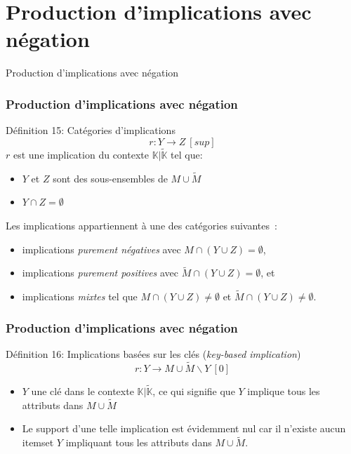 \documentclass[french]{beamer}
\def\KKc{\mathbb{K}|\tilde{\mathbb{K}}}
\begin{document}
\section[Négation]{Production d'implications avec négation}
\begin{frame}
\huge{\centerline{Production d'implications avec négation}}
\end{frame}
\begin{frame}
\frametitle{Production d'implications avec négation}
\begin{block}{Définition 15: Catégories d'implications}
$$r: Y \rightarrow Z \ [sup]$$
$r$ est une implication du contexte $\KKc$ tel que:
\begin{itemize}
\item $Y$ et $Z$ sont des sous-ensembles de $M \cup \tilde{M}$
\item $Y \cap Z = \emptyset$
\end{itemize}
Les implications appartiennent à une des catégories suivantes~: 
\begin{itemize}
\item implications \emph{purement négatives} avec $M \cap (Y \cup Z) = \emptyset$,
\item implications \emph{purement positives} avec $\tilde{M} \cap (Y \cup Z) = \emptyset$, et 
\item implications \emph{mixtes} tel que $M \cap (Y \cup Z) \ne \emptyset$ et $\tilde{M} \cap (Y \cup Z) \ne \emptyset$.
\end{itemize}
\end{block}
\end{frame}
\begin{frame}
\frametitle{Production d'implications avec négation}
\begin{block}{Définition 16: Implications basées sur les clés (\emph{key-based implication})}
$$r: Y \rightarrow M \cup \tilde{M} \backslash Y \ [0]$$
\begin{itemize}
\item $Y$ une clé dans le contexte $\KKc$, ce qui signifie que $Y$ implique tous les attributs dans $M \cup \tilde{M}$
\item Le support d'une telle implication est évidemment nul car il n'existe aucun itemset $Y$ impliquant tous les attributs dans $M \cup \tilde{M}$.
\end{itemize}
\end{block}
\end{frame}
\end{document}
